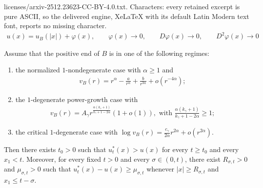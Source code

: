 \documentclass[10pt,a4paper]{amsart}
\begin{document}
licenses/arxiv-2512.23623-CC-BY-4.0.txt. Characters: every retained excerpt is pure ASCII, so the delivered engine, XeLaTeX with its default Latin Modern text font, reports no missing character.
	\begin{align}
		\label{eq:C2-asymptotic-to-bowl}
		u(x)=u_B(|x|)+\varphi(x),
		\qquad
		\varphi(x)\to0,
		\qquad
		D\varphi(x)\to0,
		\qquad
		D^2\varphi(x)\to0
	\end{align}

	\begin{lemma}
		\label{lem:start-moving-plane-at-infinity}
		Assume that the positive end of $B$ is in one of the following regimes:
		\begin{enumerate}[label=\textup{(\roman*)}]
			\item the normalized $1$-nondegenerate case with $\alpha\ge1$ and
			\begin{align*}
				v_B(r)=r^\alpha-\frac{a}{r^\alpha}+\frac{b}{r^{3\alpha}}+o(r^{-4\alpha});
			\end{align*}
			
			\item the $1$-degenerate power-growth case with
			\begin{align*}
				v_B(r)
				=
				A_\gamma
				r^{
					\frac{\alpha(k_\gamma+1)}
					{k_\gamma+1-2\alpha}
				}
				(1+o(1)),
				\mbox{ with }
				\frac{\alpha(k_\gamma+1)}
				{k_\gamma+1-2\alpha}\ge1;
			\end{align*}
			
			\item the critical $1$-degenerate case with
			$\log v_B(r)=\frac{c_\gamma}{2\alpha}r^{2\alpha}+o(r^{2\alpha})$.
		\end{enumerate}
		Then there exists $t_0>0$ such that $u_t^*(x)>u(x)$ for every
		$t\ge t_0$ and every $x_1<t$.  Moreover, for every fixed $t>0$ and every
		$\sigma\in(0,t)$, there exist $R_{\sigma,t}>0$ and $\mu_{\sigma,t}>0$ such
		that $u_t^*(x)-u(x)\ge\mu_{\sigma,t}$ whenever $|x|\ge R_{\sigma,t}$ and $x_1\le t-\sigma$.
	\end{lemma}
\end{document}
